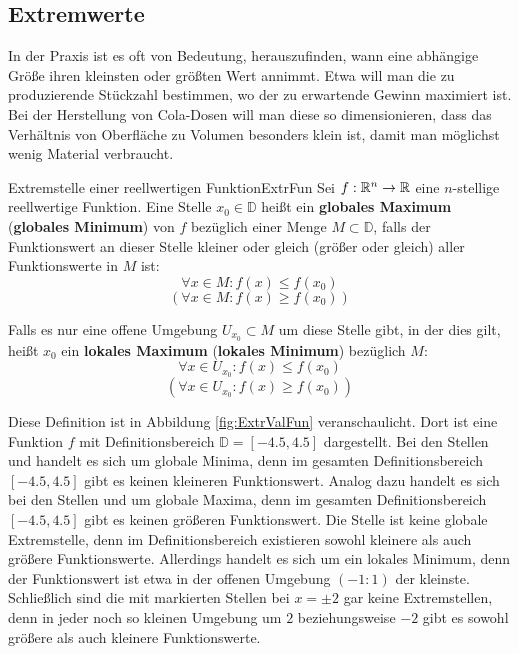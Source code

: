 \subsection{Extremwerte}

In der Praxis ist es oft von Bedeutung, herauszufinden, wann eine abhängige Größe ihren kleinsten oder größten Wert annimmt. Etwa will man die zu produzierende Stückzahl bestimmen, wo der zu erwartende Gewinn maximiert ist. Bei der Herstellung von Cola-Dosen will man diese so dimensionieren, dass das Verhältnis von Oberfläche zu Volumen besonders klein ist, damit man möglichst wenig Material verbraucht.

\begin{definition}{Extremstelle einer reellwertigen Funktion}{ExtrFun}
    Sei $f: \mathbb{R}^n \to \mathbb{R}$ eine $n$-stellige reellwertige Funktion. Eine Stelle $x_0\in\mathbb{D}$ heißt ein \textbf{globales Maximum} (\textbf{globales Minimum}) von $f$ bezüglich einer Menge $M\subset\mathbb{D}$, falls der Funktionswert an dieser Stelle kleiner oder gleich (größer oder gleich) aller Funktionswerte in $M$ ist:
    $$
		\forall x \in M: f(x) \le f(x_0)
	$$
	$$
		(\forall x \in M: f(x) \ge f(x_0))
	$$
    
    Falls es nur eine offene Umgebung $U_{x_0}\subset M$ um diese Stelle gibt, in der dies gilt, heißt $x_0$ ein \textbf{lokales Maximum} (\textbf{lokales Minimum}) bezüglich $M$:
    $$
        \forall x \in U_{x_0}: f(x) \le f(x_0)
    $$
    $$
        (\forall x \in U_{x_0}: f(x) \ge f(x_0))
    $$
\end{definition}

Diese Definition ist in Abbildung \ref{fig:ExtrValFun} veranschaulicht. Dort ist eine Funktion $f$ mit Definitionsbereich $\mathbb{D} = [-4.5, 4.5]$ dargestellt. Bei den Stellen  und  handelt es sich um globale Minima, denn im gesamten Definitionsbereich $[-4.5,4.5]$ gibt es keinen kleineren Funktionswert. Analog dazu handelt es sich bei den Stellen  und  um globale Maxima, denn im gesamten Definitionsbereich $[-4.5,4.5]$ gibt es keinen größeren Funktionswert. Die Stelle  ist keine globale Extremstelle, denn im Definitionsbereich existieren sowohl kleinere als auch größere Funktionswerte. Allerdings handelt es sich um ein lokales Minimum, denn der Funktionswert ist etwa in der offenen Umgebung $(-1:1)$ der kleinste. Schließlich sind die mit  markierten Stellen bei $x=\pm 2$ gar keine Extremstellen, denn in jeder noch so kleinen Umgebung um $2$ beziehungsweise $-2$ gibt es sowohl größere als auch kleinere Funktionswerte.

